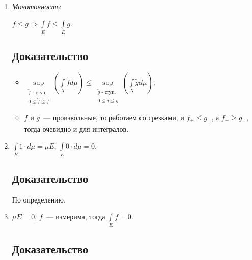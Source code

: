 \documentclass{article}
\begin{document}
        \begin{enumerate}
        
            \item \textit{Монотонность}: 
            
                $f \leqslant g \Rightarrow \int\limits_{E} f \leqslant \int\limits_{E} g$.
            
                \subsection{Доказательство}
                
                    \begin{itemize}
                    
                        \item $\sup\limits_{\substack{\text{$\widetilde{f}$ - ступ.} \\ 0 \leqslant \widetilde{f} \leqslant f}} \left( \int\limits_{X} \widetilde{f} d \mu \right) \leqslant \sup\limits_{\substack{\text{$\widetilde{g}$ - ступ.} \\ 0 \leqslant \widetilde{g} \leqslant g}} \left( \int\limits_{X} \widetilde{g} d \mu \right)$;
                        
                        \item $f$ и $g$~--- произвольные, то работаем со срезками, и $f_+ \leqslant g_+$, а $f_- \geqslant g_-$, тогда очевидно и для интегралов.
                        
                    \end{itemize}
            
            \item $\int\limits_{E} 1 \cdot d \mu = \mu E$, $\int\limits_{E} 0 \cdot d \mu = 0$.
            
                \subsection{Доказательство}
                
                    По определению.
            
            \item $\mu E = 0$, $f$~--- измерима, тогда $\int\limits_{E} f = 0$.
            
                \subsection{Доказательство}
                

\end{enumerate}
\end{document}

